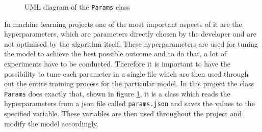 \begin{figure}[htbp]
{
    }
	\caption{UML diagram of the \texttt{Params} class}
	\label{fig:UML-Params}
\end{figure}
\noindent
In machine learning projects one of the most important aspects of it are the hyperparameters, which are parameters directly chosen by the developer and are not optimised by the algorithm itself. These hyperparameters are used for tuning the model to achieve the best possible outcome and to do that, a lot of experiments have to be conducted. Therefore it is important to have the possibility to tune each parameter in a single file which are then used through out the entire training process for the particular model. In this project the class \texttt{Params} does exactly that, shown in figure \ref{fig:UML-Params}, it is a class which reads the hyperparameters from a json file called \texttt{params.json} and saves the values to the specified variable. These variables are then used throughout the project and modify the model accordingly.

